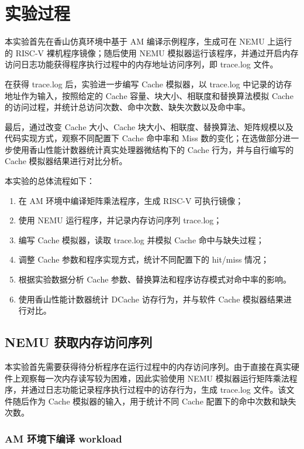 \section{实验过程}

本实验首先在香山仿真环境中基于 AM 编译示例程序，生成可在 NEMU 上运行的 RISC-V 裸机程序镜像；随后使用 NEMU 模拟器运行该程序，并通过开启内存访问日志功能获得程序执行过程中的内存地址访问序列，即 trace.log 文件。

在获得 trace.log 后，实验进一步编写 Cache 模拟器，以 trace.log 中记录的访存地址作为输入，按照给定的 Cache 容量、块大小、相联度和替换算法模拟 Cache 的访问过程，并统计总访问次数、命中次数、缺失次数以及命中率。

最后，通过改变 Cache 大小、Cache 块大小、相联度、替换算法、矩阵规模以及代码实现方式，观察不同配置下 Cache 命中率和 Miss 数的变化；在选做部分进一步使用香山性能计数器统计真实处理器微结构下的 Cache 行为，并与自行编写的 Cache 模拟器结果进行对比分析。

本实验的总体流程如下：

\begin{enumerate}
    \item 在 AM 环境中编译矩阵乘法程序，生成 RISC-V 可执行镜像；
    \item 使用 NEMU 运行程序，并记录内存访问序列 trace.log；
    \item 编写 Cache 模拟器，读取 trace.log 并模拟 Cache 命中与缺失过程；
    \item 调整 Cache 参数和程序实现方式，统计不同配置下的 hit/miss 情况；
    \item 根据实验数据分析 Cache 参数、替换算法和程序访存模式对命中率的影响。
    \item 使用香山性能计数器统计 DCache 访存行为，并与软件 Cache 模拟器结果进行对比。
\end{enumerate}

\subsection{NEMU 获取内存访问序列}

本实验首先需要获得待分析程序在运行过程中的内存访问序列。由于直接在真实硬件上观察每一次内存读写较为困难，因此实验使用 NEMU 模拟器运行矩阵乘法程序，并通过日志功能记录程序执行过程中的访存行为，生成 trace.log 文件。该文件随后作为 Cache 模拟器的输入，用于统计不同 Cache 配置下的命中次数和缺失次数。

\subsubsection{AM 环境下编译 workload}

